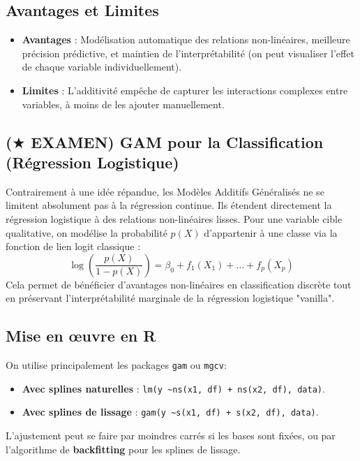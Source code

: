 \subsection{Avantages et Limites}
\begin{itemize}
    \item \textbf{Avantages} : Modélisation automatique des relations non-linéaires, meilleure précision prédictive, et maintien de l'interprétabilité (on peut visualiser l'effet de chaque variable individuellement).
    \item \textbf{Limites} : L'additivité empêche de capturer les interactions complexes entre variables, à moins de les ajouter manuellement.
\end{itemize}

\subsection{\textbf{($\bigstar$ EXAMEN)} GAM pour la Classification (Régression Logistique)}
Contrairement à une idée répandue, les Modèles Additifs Généralisés ne se limitent absolument pas à la régression continue. Ils étendent directement la régression logistique à des relations non-linéaires lisses. Pour une variable cible qualitative, on modélise la probabilité $p(X)$ d'appartenir à une classe via la fonction de lien logit classique :
\begin{equation}
    \log\left(\frac{p(X)}{1-p(X)}\right) = \beta_0 + f_1(X_1) + \dots + f_p(X_p)
\end{equation}
Cela permet de bénéficier d'avantages non-linéaires en classification discrète tout en préservant l'interprétabilité marginale de la régression logistique "vanilla".

\subsection{Mise en œuvre en R}
On utilise principalement les packages \texttt{gam} ou \texttt{mgcv}:
\begin{itemize}
    \item \textbf{Avec splines naturelles} : \texttt{lm(y \textasciitilde ns(x1, df) + ns(x2, df), data)}.
    \item \textbf{Avec splines de lissage} : \texttt{gam(y \textasciitilde s(x1, df) + s(x2, df), data)}.
\end{itemize}
L'ajustement peut se faire par moindres carrés si les bases sont fixées, ou par l'algorithme de \textbf{backfitting} pour les splines de lissage.
